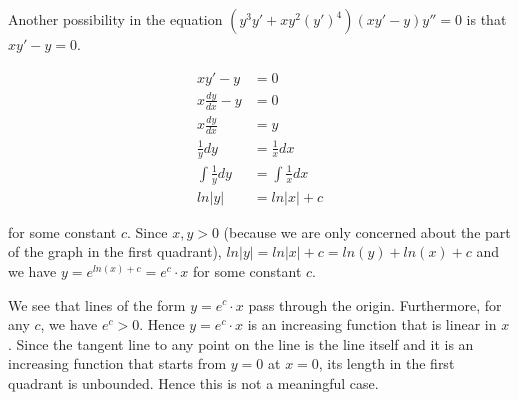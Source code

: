 \documentclass[9pt]{article}
\begin{document}
Another possibility in the equation $(y^3y' + xy^2(y')^4)(xy' - y)y'' = 0$ is that $xy' - y = 0$.

\begin{align*}
  xy' - y &= 0\\
  x\frac{dy}{dx} - y &= 0\\
  x\frac{dy}{dx} &= y\\
  \frac{1}{y}dy &= \frac{1}{x}dx\\
  \int \frac{1}{y}dy &= \int \frac{1}{x}dx\\
  ln|y| &= ln|x| + c
\end{align*}

for some constant $c$. Since $x, y > 0$ (because we are only concerned about the part of the graph in the first quadrant), $ln|y| = ln|x| + c = ln(y) + ln(x) + c$ and we have $y = e^{ln(x) + c} = e^c \cdot x$ for some constant $c$.

We see that lines of the form $y = e^c \cdot x$ pass through the origin. Furthermore, for any $c$, we have $e^c > 0$. Hence $y = e^c \cdot x$ is an increasing function that is linear in $x$. Since the tangent line to any point on the line is the line itself and it is an increasing function that starts from $y = 0$ at $x = 0$, its length in the first quadrant is unbounded. Hence this is not a meaningful case.
\end{document}
